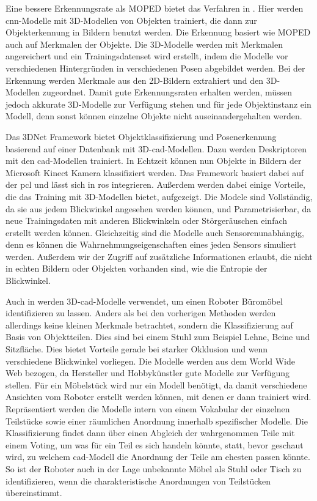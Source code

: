 Eine bessere Erkennungsrate als MOPED bietet das Verfahren in \cite{3DCNNObjRec}. Hier werden \gls{cnn}-Modelle mit 3D-Modellen von Objekten trainiert, die dann zur Objekterkennung in Bildern benutzt werden. Die Erkennung basiert wie MOPED auch auf Merkmalen der Objekte. Die 3D-Modelle werden mit Merkmalen angereichert und ein Trainingsdatenset wird erstellt, indem die Modelle vor verschiedenen Hintergründen in verschiedenen Posen abgebildet werden. Bei der Erkennung werden Merkmale aus den 2D-Bildern extrahiert und den 3D-Modellen zugeordnet. Damit gute Erkennungsraten erhalten werden, müssen jedoch akkurate 3D-Modelle zur Verfügung stehen und für jede Objektinstanz ein Modell, denn sonst können einzelne Objekte nicht auseinandergehalten werden.   \par

Das 3DNet Framework \cite{3dnet} bietet Objektklassifizierung und Posenerkennung basierend auf einer Datenbank mit 3D-\gls{cad}-Modellen. Dazu werden Deskriptoren mit den \gls{cad}-Modellen trainiert. In Echtzeit können nun Objekte in Bildern der Microsoft Kinect Kamera klassifiziert werden. Das Framework basiert dabei auf der \gls{pcl}\cite{pcl} und lässt sich in \acrshort{ros} integrieren. Außerdem werden dabei einige Vorteile, die das Training mit 3D-Modellen bietet, aufgezeigt. Die Modele sind Vollständig, da sie aus jedem Blickwinkel angesehen werden können, und Parametrisierbar, da neue Trainingsdaten mit anderen Blickwinkeln oder Störgeräuschen einfach erstellt werden können. Gleichzeitig sind die Modelle auch Sensorenunabhängig, denn es können die Wahrnehmungseigenschaften eines jeden Sensors simuliert werden. Außerdem wir der Zugriff auf zusätzliche Informationen erlaubt, die nicht in echten Bildern oder Objekten vorhanden sind, wie die Entropie der Blickwinkel.  \par 

Auch in \citep{modelsWWW} werden 3D-\gls{cad}-Modelle verwendet, um einen Roboter Büromöbel identifizieren zu lassen. Anders als bei den vorherigen Methoden werden allerdings keine kleinen Merkmale betrachtet, sondern die Klassifizierung auf Basis von Objektteilen. Dies sind bei einem Stuhl zum Beispiel Lehne, Beine und Sitzfläche. Dies bietet Vorteile gerade bei starker Okklusion und wenn verschiedene Blickwinkel vorliegen. Die Modelle werden aus dem World Wide Web bezogen, da Hersteller und Hobbykünstler gute Modelle zur Verfügung stellen. Für ein Möbelstück wird nur ein Modell benötigt, da damit verschiedene Ansichten vom Roboter erstellt werden können, mit denen er dann trainiert wird. Repräsentiert werden die Modelle intern von einem Vokabular der einzelnen Teilstücke sowie einer räumlichen Anordnung innerhalb spezifischer Modelle. Die Klassifizierung findet dann über einen Abgleich der wahrgenommen Teile mit einem Voting, um was für ein Teil es sich handeln könnte, statt, bevor geschaut wird, zu welchem \gls{cad}-Modell die Anordnung der Teile am ehesten passen könnte. So ist der Roboter auch in der Lage unbekannte Möbel als Stuhl oder Tisch zu identifizieren, wenn die charakteristische Anordnungen von Teilstücken übereinstimmt.   

